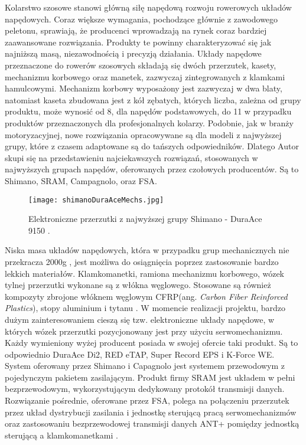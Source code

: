 Kolarstwo szosowe stanowi główną siłę napędową rozwoju rowerowych układów napędowych. Coraz większe wymagania, pochodzące głównie z zawodowego peletonu, sprawiają, że producenci wprowadzają na rynek coraz bardziej zaawansowane rozwiązania. Produkty te powinny charakteryzować się jak najniższą masą, niezawodnością i precyzją działania. Układy napędowe przeznaczone do rowerów szosowych składają się dwóch przerzutek, kasety, mechanizmu korbowego oraz manetek, zazwyczaj zintegrowanych z klamkami hamulcowymi. Mechanizm korbowy wyposażony jest zazwyczaj w dwa blaty, natomiast kaseta zbudowana jest z kół zębatych, których liczba, zależna od grupy produktu, może wynosić od 8, dla napędów podstawowych, do 11 w przypadku produktów przeznaczonych dla profesjonalnych kolarzy. Podobnie, jak w branży motoryzacyjnej, nowe rozwiązania opracowywane są dla modeli z najwyższej grupy, które z czasem adaptowane są do tańszych odpowiedników. Dlatego Autor skupi się na przedstawieniu najciekawszych rozwiązań, stosowanych w najwyższych grupach napędów, oferowanych przez czołowych producentów. Są to Shimano, SRAM, Campagnolo, oraz FSA.
\begin{figure}[h]
    \centering
    \texttt{[image: shimanoDuraAceMechs.jpg]}
    \caption{Elektroniczne przerzutki z najwyższej grupy Shimano - DuraAce 9150 \cite{shimanoDuraAce}.}
    \label{fig:majkaBike}
\end{figure}
Niska masa układów napędowych, która w przypadku grup mechanicznych nie przekracza 2000g \cite{roadGroupSetWeights}, jest możliwa do osiągnięcia poprzez zastosowanie bardzo lekkich materiałów. Klamkomanetki, ramiona mechanizmu korbowego, wózek tylnej przerzutki wykonane są z włókna węglowego. Stosowane są również kompozyty zbrojone włóknem węglowym CFRP(ang. \textit{Carbon Fiber Reinforced Plastics}), stopy aluminium i tytanu \cite{shimanoDuraAce}. W momencie realizacji projektu, bardzo dużym zainteresowaniem cieszą się tzw. elektroniczne układy napędowe, w których wózek przerzutki pozycjonowany jest przy użyciu serwomechanizmu. Każdy wymieniony wyżej producent posiada w swojej ofercie taki produkt. Są to odpowiednio DuraAce Di2, RED eTAP, Super Record EPS i K-Force WE. System oferowany przez Shimano i Capagnolo jest systemem przewodowym z pojedynczym pakietem zasilającym. Produkt firmy SRAM jest układem w pełni bezprzewodowym, wykorzystującym dedykowany protokół transmisji danych. Rozwiązanie pośrednie, oferowane przez FSA, polega na połączeniu przerzutek przez układ dystrybucji zasilania i jednostkę sterującą pracą serwomechanizmów oraz zastosowaniu bezprzewodowej transmisji danych ANT+ pomiędzy jednostką sterującą a klamkomanetkami \cite{kforce}.


